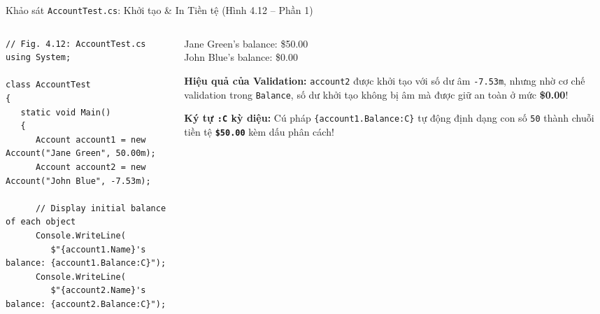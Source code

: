 \documentclass[aspectratio=169, 10pt]{beamer}
\begin{document}
\begin{frame}[fragile]{Khảo sát \texttt{AccountTest.cs}: Khởi tạo \& In Tiền tệ (Hình 4.12 -- Phần 1)}
  \begin{columns}[T]
    \begin{column}{0.55\textwidth}
      \begin{tcolorbox}[colback=CodeBg,colframe=UniNavy,title=\textbf{AccountTest.cs Part 1 (Fig. 4.12)},fonttitle=\small\bfseries]
\begin{lstlisting}
// Fig. 4.12: AccountTest.cs
using System;

class AccountTest
{
   static void Main()
   {
      Account account1 = new Account("Jane Green", 50.00m);
      Account account2 = new Account("John Blue", -7.53m);

      // Display initial balance of each object
      Console.WriteLine(
         $"{account1.Name}'s balance: {account1.Balance:C}");
      Console.WriteLine(
         $"{account2.Name}'s balance: {account2.Balance:C}");
\end{lstlisting}
      \end{tcolorbox}
    \end{column}

    \begin{column}{0.43\textwidth}
      \begin{tcolorbox}[colback=UniDark,colframe=UniNavy,title=\textbf{Output Khởi tạo},fonttitle=\small\bfseries]
        \color{white}\ttfamily\scriptsize
        Jane Green's balance: \$50.00\\
        John Blue's balance: \$0.00
      \end{tcolorbox}
      \begin{alertblock}{\textbf{Hiệu quả của Validation:}}
        \small \texttt{account2} được khởi tạo với số dư âm \texttt{-7.53m}, nhưng nhờ cơ chế validation trong \texttt{Balance}, số dư khởi tạo không bị âm mà được giữ an toàn ở mức \textbf{\$0.00}!
      \end{alertblock}
      \begin{exampleblock}{\textbf{Ký tự \texttt{:C} kỳ diệu:}}
        \small Cú pháp \texttt{\{account1.Balance:C\}} tự động định dạng con số \texttt{50} thành chuỗi tiền tệ \textbf{\texttt{\$50.00}} kèm dấu phân cách!
      \end{exampleblock}
    \end{column}
  \end{columns}
\end{frame}
\end{document}
